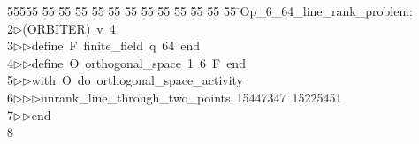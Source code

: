 %
%
\begin{tabbing}
55555 \= 55 \= 55 \= 55 \= 55 \= 55 \= 55 \= 55 \= 55 \= 55 \= 55 \= 55 \= 55 \= \>Op\_6\_64\_line\_rank\_problem:\\[0pt]
2\>$\triangleright$\>(ORBITER)\ v\ 4\ \\[0pt]
3\>$\triangleright$\>$\triangleright$\>define\ F\ finite\_field\ q\ 64\ end\ \\[0pt]
4\>$\triangleright$\>$\triangleright$\>define\ O\ orthogonal\_space\ 1\ 6\ F\ end\ \\[0pt]
5\>$\triangleright$\>$\triangleright$\>with\ O\ do\ orthogonal\_space\_activity\ \\[0pt]
6\>$\triangleright$\>$\triangleright$\>$\triangleright$\>unrank\_line\_through\_two\_points\ 15447347\ 15225451\ \\[0pt]
7\>$\triangleright$\>$\triangleright$\>end\\[0pt]
8\>\end{tabbing}
